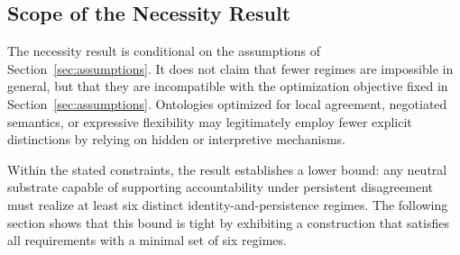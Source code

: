 \subsection{Scope of the Necessity Result}

The necessity result is conditional on the assumptions of Section~\ref{sec:assumptions}.
It does not claim that fewer regimes are impossible in general, but that they
are incompatible with the optimization objective fixed in Section~\ref{sec:assumptions}.
Ontologies optimized for local agreement, negotiated semantics, or expressive
flexibility may legitimately employ fewer explicit distinctions by relying on
hidden or interpretive mechanisms.

Within the stated constraints,
the result establishes a lower
bound: any neutral substrate capable of supporting accountability under
persistent disagreement must realize at least six distinct
identity-and-persistence regimes.
The following section shows that this bound is tight by exhibiting a
construction that satisfies all requirements with a minimal set of six regimes.
